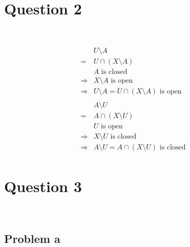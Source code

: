 \documentclass{article}
\begin{document}
\newpage

\section*{Question 2}

~

\begin{equation*}
    \begin{split}
        &U\setminus A\\
        =&U\cap(X\setminus A)\\
        &A\text{ is closed}\\
        \Rightarrow&X\setminus A\text{ is open}\\
        \Rightarrow&U\setminus A=U\cap(X\setminus A)\text{ is open}\\
        &\\
        &A\setminus U\\
        =&A\cap(X\setminus U)\\
        &U\text{ is open}\\
        \Rightarrow&X\setminus U\text{ is closed}\\
        \Rightarrow&A\setminus U=A\cap(X\setminus U)\text{ is closed}\\
    \end{split}
\end{equation*}

\newpage

\section*{Question 3}

~

\subsection*{Problem a}
\end{document}
